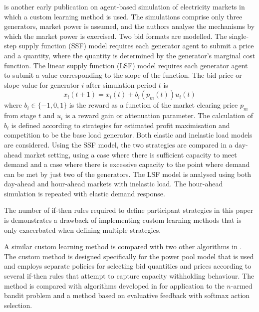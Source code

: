  is another early publication on agent-based simulation of
electricity markets in which a custom learning method is used.  The simulations
comprise only three generators, market power is assumed, and the authors analyse
the mechanisms by which the market power is exercised.  Two bid formats are
modelled.  The single-step supply function (SSF) model requires each generator
agent to submit a price and a quantity, where the quantity is determined by the
generator's marginal cost function.  The linear supply function (LSF) model
requires each generator agent to submit a value corresponding to the slope of
the function.  The bid price or slope value for generator $i$ after simulation
period $t$ is
\begin{equation}
x_i(t+1) = x_i(t) + b_i (p_m(t)) u_i(t)
\end{equation}
where $b_i \in \lbrace-1,0,1\rbrace$ is the reward as a function of the market
clearing price $p_m$ from stage $t$ and $u_i$ is a reward gain or attenuation
parameter.  The calculation of $b_i$ is defined according to strategies for
estimated profit maximisation and competition to be the base load generator.
Both elastic and inelastic load models are considered.  Using the SSF
model, the two strategies are compared in a day-ahead market setting,
using a case where there is sufficient capacity to meet demand and a case where
there is excessive capacity to the point where demand can be met by just two of
the generators.  The LSF model is analysed using both day-ahead and
hour-ahead markets with inelastic load.  The hour-ahead simulation is repeated
with elastic demand response.

The number of if-then rules required to define participant strategies in this
paper is demonstrates a drawback of implementing custom learning methods that
is only exacerbated when defining multiple strategies.

A similar custom learning method is compared with two other algorithms in
.  The custom method is designed specifically for the
power pool model that is used and employs separate policies for selecting bid
quantities and prices according to several if-then rules that attempt to
capture capacity withholding behaviour.  The method is compared with
algorithms developed in  for application to the $n$-armed
bandit problem \cite[\S2.1]{robbins:53,suttonbarto:1998} and a method based on
evaluative feedback with softmax action selection.

